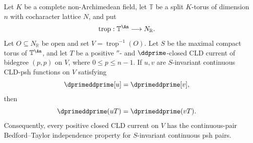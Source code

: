 \begin{proposition}
\label{prop:p213-invariant-split-toric-continuous-pairs-candidate}
Let $K$ be a complete non-Archimedean field, let $\mathbb T$ be a split
$K$-torus of dimension $n$ with cocharacter lattice $N$, and put
\[
 \operatorname{trop}:\mathbb T^{\An}\longrightarrow N_{\mathbb R}.
\]
Let $O\subseteq N_{\mathbb R}$ be open and set
$V=\operatorname{trop}^{-1}(O)$.  Let $S$ be the maximal compact torus of
$\mathbb T^{\An}$, and let $T$ be a positive $\dprime$- and
$\ddprime$-closed CLD current of bidegree $(p,p)$ on $V$, where
$0\leq p\leq n-1$.  If $u,v$ are $S$-invariant continuous CLD-psh functions
on $V$ satisfying
\[
 \dprimeddprime[u]=\dprimeddprime[v],
\]
then
\[
 \dprimeddprime(uT)=\dprimeddprime(vT).
\]
Consequently, every positive closed CLD current on $V$ has the
continuous-pair Bedford--Taylor independence property for $S$-invariant
continuous psh pairs.
\end{proposition}
